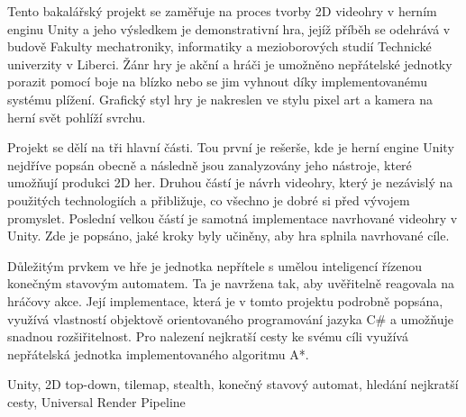 \documentclass[FM,Proj]{tulthesis}
\begin{document}
	
	\begin{abstractCZ}
		Tento bakalářský projekt se zaměřuje na proces tvorby 2D videohry v herním enginu Unity a jeho výsledkem je demonstrativní hra, jejíž příběh se odehrává v budově Fakulty mechatroniky, informatiky a mezioborových studií Technické univerzity v Liberci. Žánr hry je akční a hráči je umožněno nepřátelské jednotky porazit pomocí boje na blízko nebo se jim vyhnout díky implementovanému systému plížení. Grafický styl hry je nakreslen ve stylu pixel art a kamera na herní svět pohlíží svrchu.
		
		Projekt se dělí na tři hlavní části. Tou první je rešerše, kde je herní engine Unity nejdříve popsán obecně a následně jsou zanalyzovány jeho nástroje, které umožňují produkci 2D her. Druhou částí je návrh videohry, který je nezávislý na použitých technologiích a přibližuje, co všechno je dobré si před vývojem promyslet. Poslední velkou částí je samotná implementace navrhované videohry v Unity. Zde je popsáno, jaké kroky byly učiněny, aby hra splnila navrhované cíle.
		
		Důležitým prvkem ve hře je jednotka nepřítele s umělou inteligencí řízenou konečným stavovým automatem. Ta je navržena tak, aby uvěřitelně reagovala na hráčovy akce. Její implementace, která je v tomto projektu podrobně popsána, využívá vlastností objektově orientovaného programování jazyka C\# a umožňuje snadnou rozšiřitelnost. Pro nalezení nejkratší cesty ke svému cíli využívá nepřátelská jednotka implementovaného algoritmu A*.
	\end{abstractCZ}
	
	\begin{keywordsCZ}
		Unity, 2D top-down, tilemap, stealth, konečný stavový automat, hledání nejkratší cesty, Universal Render Pipeline
	\end{keywordsCZ}
	\vspace{2cm}
	
\end{document}

